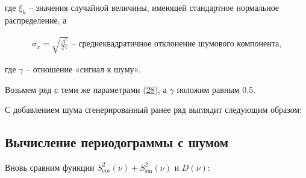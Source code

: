 \documentclass[12pt]{article}
\newcommand{\hl}[1]{(\hyperlink{eq:#1}{#1})}
\newcommand{\sd}[1]{\hypertarget{skip:#1}{\vspace{-10pt}}}
\begin{document}
где $ \xi_{k} $ -- значения случайной величины, имеющей стандартное нормальное распределение, а

\sd{30}
\begin{gather}
    \sigma_{x} = \sqrt{\frac{A^2}{2 \gamma}} \mbox{ -- среднеквадратичное отклонение шумового компонента,}
\end{gather}

где $ \gamma $ -- отношение «сигнал к шуму». \par

\vspace{\baselineskip}

Возьмем ряд с теми же параметрами \hl{28}, а $ \gamma $ положим равным 0.5. \par

\vspace{\baselineskip}

С добавлением шума сгенерированный ранее ряд выглядит следующим образом:

\vspace{10pt}
\begin{minipage}[h]{\linewidth}
\end{minipage}

\subsection{Вычисление периодограммы с шумом}

Вновь сравним функции $ S_{\cos}^2(\nu) + S_{\sin}^2(\nu) $ и $ D(\nu) $:
\end{document}
